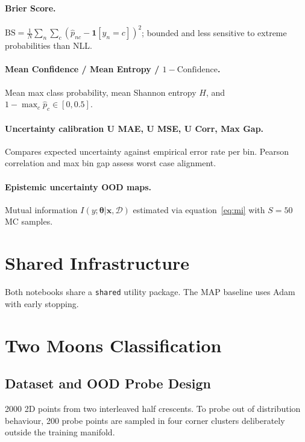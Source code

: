 \documentclass[conference]{IEEEtran}
\newcommand{\btheta}{\bm{\theta}}
\newcommand{\cD}{\mathcal{D}}
\begin{document}
\paragraph{Brier Score.}
$\mathrm{BS}=\frac{1}{N}\sum_n\sum_c(\hat{p}_{nc}-\mathbf{1}[y_n=c])^2$;
bounded and less sensitive to extreme probabilities than NLL.

\paragraph{Mean Confidence / Mean Entropy / $1 - \text{Confidence}$.}
Mean max class probability, mean Shannon entropy $H$, and
$1-\max_c\hat{p}_c\in[0,0.5]$.

\paragraph{Uncertainty calibration U MAE, U MSE, U Corr, Max Gap.}
Compares expected uncertainty against empirical error rate
per bin. Pearson correlation and max bin gap assess worst case alignment.

\paragraph{Epistemic uncertainty OOD maps.}
Mutual information $I(y;\btheta|\bm{x},\cD)$ estimated via
equation~\eqref{eq:mi} with $S=50$ MC samples.

\section{Shared Infrastructure}
\label{sec:shared}

Both notebooks share a \texttt{shared} utility package. The MAP baseline uses Adam with early stopping.

\section{Two Moons Classification}
\label{sec:twomoons}

\subsection{Dataset and OOD Probe Design}

2000 2D points from two interleaved half crescents.
To probe out of distribution behaviour, 200 probe points are
sampled in four corner clusters deliberately outside the training manifold.
\end{document}
